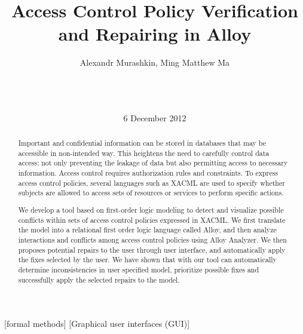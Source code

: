 \documentclass{acm_proc_article-sp}
\begin{document}
\title{Access Control Policy Verification and Repairing in Alloy}


\author{
\alignauthor Alexandr Murashkin, Ming Matthew Ma \\
       \\
       \\
       \\
}
\date{6 December 2012}
\maketitle

\begin{abstract}

Important and confidential information can be stored in databases that may be accessible in non-intended way. This heightens the need to carefully control data access: not only preventing the leakage of data but also permitting access to necessary information. Access control requires authorization rules and constraints. To express access control policies, several languages such as XACML are used to specify whether subjects are allowed to access sets of resources or services to perform specific actions. 

We develop a tool based on first-order logic modeling to detect and visualize possible conflicts within sets of access control policies expressed in XACML. We first translate the model into a relational first order logic language called Alloy, and then analyze interactions and conflicts among access control policies using Alloy Analyzer. We then proposes potential repairs to the user through user interface, and automatically apply the fixes selected by the user. We have shown that with our tool can automatically determine inconsistencies in user specified model, prioritize possible fixes and successfully apply the selected repairs to the model. 

\end{abstract}

[formal methods]
[Graphical user interfaces (GUI)]

\end{document}
